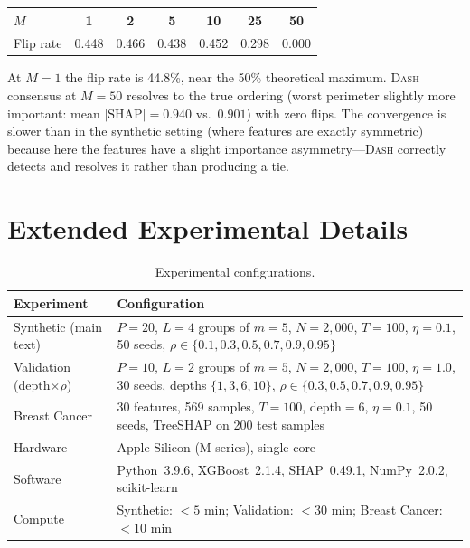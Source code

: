 \documentclass{article}
\newcommand{\SHAP}{\mathrm{SHAP}}
\newcommand{\DASH}{\textsc{Dash}}
\begin{document}
\begin{center}
\small
\begin{tabular}{@{}lcccccc@{}}
\toprule
$M$ & 1 & 2 & 5 & 10 & 25 & 50 \\
\midrule
Flip rate & 0.448 & 0.466 & 0.438 & 0.452 & 0.298 & 0.000 \\
\bottomrule
\end{tabular}
\end{center}

At $M{=}1$ the flip rate is 44.8\%, near the 50\% theoretical maximum.
\DASH{} consensus at $M{=}50$ resolves to the true ordering (worst
perimeter slightly more important: mean $|\SHAP| = 0.940$ vs.\ $0.901$)
with zero flips.
The convergence is slower than in the synthetic setting (where
features are exactly symmetric) because here the features have a slight
importance asymmetry---\DASH{} correctly detects and resolves it rather
than producing a tie.

\section{Extended Experimental Details}

\begin{table}[htbp]
\centering
\caption{Experimental configurations.}
\small
\begin{tabular}{@{}lp{9cm}@{}}
\toprule
Experiment & Configuration \\
\midrule
Synthetic (main text) & $P{=}20$, $L{=}4$ groups of $m{=}5$,
  $N{=}2{,}000$, $T{=}100$, $\eta{=}0.1$, 50 seeds,
  $\rho \in \{0.1, 0.3, 0.5, 0.7, 0.9, 0.95\}$ \\
Validation (depth$\times\rho$) & $P{=}10$, $L{=}2$ groups of $m{=}5$,
  $N{=}2{,}000$, $T{=}100$, $\eta{=}1.0$, 30 seeds,
  depths $\{1,3,6,10\}$, $\rho \in \{0.3, 0.5, 0.7, 0.9, 0.95\}$ \\
Breast Cancer & 30 features, 569 samples, $T{=}100$,
  depth${=}6$, $\eta{=}0.1$, 50 seeds, TreeSHAP on 200 test samples \\
\midrule
Hardware & Apple Silicon (M-series), single core \\
Software & Python~3.9.6, XGBoost~2.1.4, SHAP~0.49.1, NumPy~2.0.2,
  scikit-learn \\
Compute & Synthetic: ${<}5$ min; Validation: ${<}30$ min;
  Breast Cancer: ${<}10$ min \\
\bottomrule
\end{tabular}
\end{table}
\end{document}
